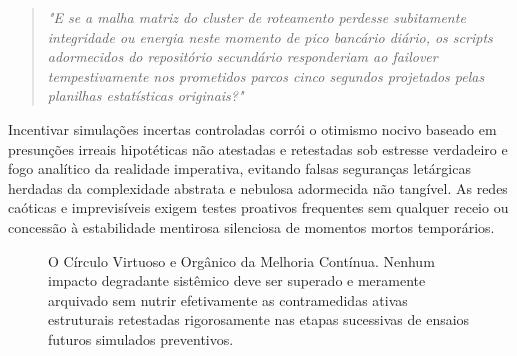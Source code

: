 \documentclass[12pt,a4paper]{report}
\begin{document}
\begin{quote}
    \textit{"E se a malha matriz do cluster de roteamento perdesse subitamente integridade ou energia neste momento de pico bancário diário, os scripts adormecidos do repositório secundário responderiam ao \textit{failover} tempestivamente nos prometidos parcos cinco segundos projetados pelas planilhas estatísticas originais?"}
\end{quote}

Incentivar simulações incertas controladas corrói o otimismo nocivo baseado em presunções irreais hipotéticas não atestadas e retestadas sob estresse verdadeiro e fogo analítico da realidade imperativa, evitando falsas seguranças letárgicas herdadas da complexidade abstrata e nebulosa adormecida não tangível. As redes caóticas e imprevisíveis exigem testes proativos frequentes sem qualquer receio ou concessão à estabilidade mentirosa silenciosa de momentos mortos temporários.

\begin{figure}[h]
    \centering
    \caption{O Círculo Virtuoso e Orgânico da Melhoria Contínua. Nenhum impacto degradante sistêmico deve ser superado e meramente arquivado sem nutrir efetivamente as contramedidas ativas estruturais retestadas rigorosamente nas etapas sucessivas de ensaios futuros simulados preventivos.}
\end{figure}
\end{document}
